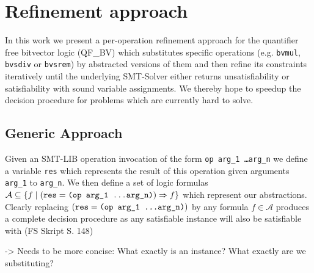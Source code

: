 \chapter{Refinement approach}
\label{ch:refinement_approach}
In this work we present a per-operation refinement approach for the quantifier free bitvector logic (QF\_BV) which substitutes specific operations (e.g. \texttt{bvmul}, \texttt{bvsdiv} or \texttt{bvsrem}) by abstracted versions of them and then refine its constraints iteratively until the underlying SMT-Solver either returns unsatisfiability or satisfiability with sound variable assignments. We thereby hope to speedup the decision procedure for problems which are currently hard to solve.

\section{Generic Approach}


Given an SMT-LIB operation invocation of the form \texttt{op arg\_1 \dots arg\_n} we define a variable \texttt{res} which represents the result of this operation given arguments \texttt{arg\_1} to \texttt{arg\_n}.
We then define a set of logic formulas
$\mathcal{A} \subseteq \{f \mid \left( \texttt{res}=\texttt{(op arg\_1 \dots arg\_n)} \right) \Rightarrow f\}$ which represent our abstractions. Clearly replacing $\left( \texttt{res}=\texttt{(op arg\_1 \dots arg\_n)} \right)$ by any formula $f\in\mathcal{A}$ produces a complete decision procedure as any satisfiable instance will also be satisfiable with (FS Skript S. 148)


-> Needs to be more concise: What exactly is an instance? What exactly are we substituting?